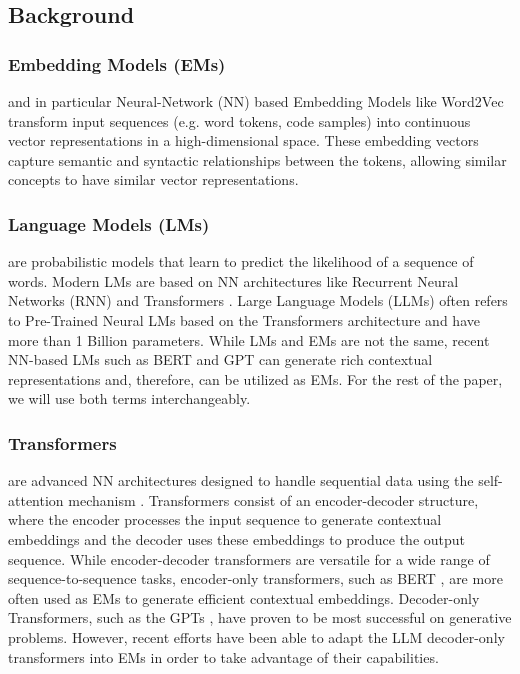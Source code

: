 \subsection{Background}
\subsubsection{Embedding Models (EMs)} and in particular Neural-Network (NN) based Embedding Models like Word2Vec \cite{mikolov2013word2vec1} transform input sequences (e.g. word tokens, code samples) into continuous vector representations in a high-dimensional space. These embedding vectors capture semantic and syntactic relationships between the tokens, allowing similar concepts to have similar vector representations. 

\subsubsection{Language Models (LMs)} are probabilistic models that learn to predict the likelihood of a sequence of words. Modern LMs are based on NN architectures like Recurrent Neural Networks (RNN) \cite{alon2019code2seq} and Transformers \cite{devlin2019bert,liu2019roberta,radford2018gpt1}. Large Language Models (LLMs) often refers to Pre-Trained Neural LMs based on the Transformers \cite{vaswani2017attention} architecture and have more than 1 Billion parameters. While LMs and EMs are not the same, recent NN-based LMs such as BERT \cite{devlin2019bert} and GPT \cite{radford2018gpt1} can generate rich contextual representations and, therefore, can be utilized as EMs. For the rest of the paper, we will use both terms interchangeably.

\subsubsection{Transformers} are advanced NN architectures designed to handle sequential data using the self-attention mechanism \cite{vaswani2017attention}.  Transformers consist of an encoder-decoder structure, where the encoder processes the input sequence to generate contextual embeddings and the decoder uses these embeddings to produce the output sequence. While encoder-decoder transformers \cite{raffel2020t5} are versatile for a wide range of sequence-to-sequence tasks, encoder-only transformers, such as BERT \cite{devlin2019bert}, are more often used as EMs to generate efficient contextual embeddings. Decoder-only Transformers, such as the GPTs \cite{radford2018gpt1,brown2020gpt3}, have proven to be most successful on generative problems. However, recent efforts have been able to adapt the LLM decoder-only transformers into EMs \cite{springer2024llmrepetition,parishad2024llm2vec,muennighoff2024gritlm,SFRAIResearch2024sfrmistral} in order to take advantage of their capabilities.




